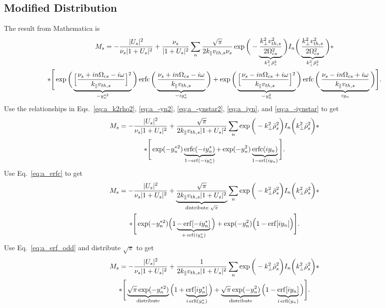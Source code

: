 \subsection{Modified Distribution}
The result from Mathematica is 
\begin{multline}
	M_s = -\frac{|U_s|^2}{\nu_s|1+U_s|^2}
	+ \frac{\nu_s}{|1+U_s|^2}  \sum_n
	\frac{\sqrt{\pi}}{2 k_\parallel v_{th,s} \nu_s}
	\exp\bigg( - \underbrace{\frac{k_\perp^2 v_{th,s}^2}{2 \Omega_{cs}^2}}_{k_\perp^2 \bar{\rho}_s^2}  \bigg)
	I_n\bigg( \underbrace{\frac{k_\perp^2 v_{th,s}^2}{2 \Omega_{cs}^2}}_{k_\perp^2 \bar{\rho}_s^2}  \bigg)* \\
	* \Bigg[
	\exp \bigg( \underbrace{\Big[ \frac{\nu_s + i n\Omega_{cs} - i\omega}{k_\parallel v_{th,s}} \Big]^2}_{-y_n^{*2}} \bigg)
	\operatorname{erfc} \bigg( \underbrace{\frac{\nu_s + i n\Omega_{cs} - i\omega}{k_\parallel v_{th,s}}}_{-iy_n^*}  \bigg)
	+ \exp \bigg( \underbrace{\Big[ \frac{\nu_s - i n\Omega_{cs} + i\omega}{k_\parallel v_{th,s}} \Big]^2}_{-y_n^2} \bigg)
	\operatorname{erfc} \bigg( \underbrace{\frac{\nu_s - i n\Omega_{cs} + i\omega}{k_\parallel v_{th,s}} }_{i y_n}  \bigg)
	\Bigg].
\end{multline}
Use the relationships in Eqs.~\ref{eq:a_k2rho2}, \ref{eq:a_-yn2}, \ref{eq:a_-ynstar2}, \ref{eq:a_iyn}, and \ref{eq:a_-iynstar} to get
\begin{multline}
	M_s = -\frac{|U_s|^2}{\nu_s|1+U_s|^2}
	+ \frac{\sqrt{\pi}}{2 k_\parallel v_{th,s}|1+U_s|^2}  \sum_n
	\exp\bigg( - k_\perp^2 \bar{\rho}_s^2  \bigg)
	I_n\bigg( k_\perp^2 \bar{\rho}_s^2 \bigg)* \\
	* \Bigg[
	\exp ( -y_n^{*2}) 
	\underbrace{\operatorname{erfc} ( -iy_n^*) }_{1-\operatorname{erf}(-iy_n^*)}
	+ \exp ( -y_n^2) 
	\underbrace{\operatorname{erfc} (i y_n)  }_{1-\operatorname{erf}(iy_n)}
	\Bigg].
\end{multline}
Use Eq.~\ref{eq:a_erfc} to get
\begin{multline}
	M_s = -\frac{|U_s|^2}{\nu_s|1+U_s|^2}
	+ \underbrace{\frac{\sqrt{\pi}}{2 k_\parallel v_{th,s}|1+U_s|^2}}_{\text{distribute }\sqrt{\pi}}  \sum_n
	\exp\bigg( - k_\perp^2 \bar{\rho}_s^2  \bigg)
	I_n\bigg( k_\perp^2 \bar{\rho}_s^2 \bigg)* \\
	* \Bigg[
	\exp ( -y_n^{*2}) 
	\Big(1\underbrace{-\operatorname{erf}[-iy_n^*]}_{+\operatorname{erf}(iy_n^*)} \Big)
	+ \exp ( -y_n^2) 
	\Big(1-\operatorname{erf}[iy_n] \Big)
	\Bigg].
\end{multline}
Use Eq.~\ref{eq:a_erf_odd} and distribute $\sqrt{\pi}$ to get
\begin{multline}
	M_s = -\frac{|U_s|^2}{\nu_s|1+U_s|^2}
	+ \frac{1}{2 k_\parallel v_{th,s}|1+U_s|^2}  \sum_n
	\exp\bigg( - k_\perp^2 \bar{\rho}_s^2  \bigg)
	I_n\bigg( k_\perp^2 \bar{\rho}_s^2 \bigg)* \\
	* \Bigg[
	\underbrace{\sqrt{\pi}\exp ( -y_n^{*2}) }_{\text{distribute}}
	\Big(1+\underbrace{\operatorname{erf}[iy_n^*]}_{i \operatorname{erfi}(y_n^*)} \Big)
	+ \underbrace{\sqrt{\pi} \exp ( -y_n^2) }_{\text{distribute}}
	\Big(1-\underbrace{\operatorname{erf}[iy_n]}_{i\operatorname{erfi}(y_n)} \Big)
	\Bigg].
\end{multline}
